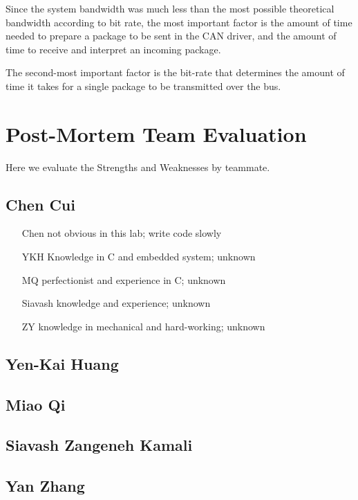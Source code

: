 \documentclass[a4paper]{article}
\begin{document}
Since the system bandwidth was much less than the most possible theoretical bandwidth according to bit rate, the most important factor is the amount of time needed to prepare a package to be sent in the CAN driver, and the amount of time to receive and interpret an incoming package.

The second-most important factor is the bit-rate that determines the amount of time it takes for a single package to be transmitted over the bus.

\newpage
\section{Post-Mortem Team Evaluation}
Here we evaluate the Strengths and Weaknesses by teammate.

\subsection{Chen Cui}
\begin{itemize}
\item[Chen] not obvious in this lab; write code slowly
\item[YKH] Knowledge in C and embedded system; unknown
\item[MQ] perfectionist and experience in C; unknown
\item[Siavash] knowledge and experience; unknown
\item[ZY] knowledge in mechanical and hard-working; unknown
\end{itemize}

\subsection{Yen-Kai Huang}
\subsection{Miao Qi}
\subsection{Siavash Zangeneh Kamali}
\subsection{Yan Zhang}
\end{document}
